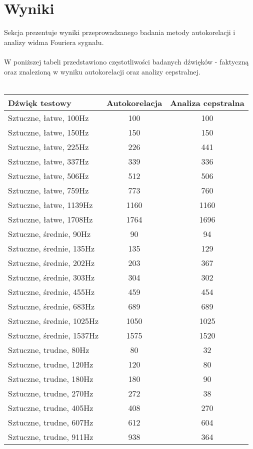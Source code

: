 \documentclass{classrep}
\begin{document}
\section{Wyniki}
Sekcja prezentuje wyniki przeprowadzanego badania metody autokorelacji i analizy widma Fouriera sygnału.\\ 
\\
W poniższej tabeli przedstawiono częstotliwości badanych dźwięków - faktyczną oraz znalezioną w wyniku autokorelacji oraz analizy cepstralnej.\\
\\
\begin{tabular}{ l | c | c }
  \hline
  Dźwięk testowy & Autokorelacja & Analiza cepstralna \\
  \hline			
  Sztuczne, łatwe, 100Hz & 100 & 100 \\
  Sztuczne, łatwe, 150Hz & 150 & 150 \\
  Sztuczne, łatwe, 225Hz & 226 & 441 \\
  Sztuczne, łatwe, 337Hz & 339 & 336 \\
  Sztuczne, łatwe, 506Hz & 512 & 506 \\
  Sztuczne, łatwe, 759Hz & 773 & 760 \\
  Sztuczne, łatwe, 1139Hz & 1160 & 1160 \\
  Sztuczne, łatwe, 1708Hz & 1764 & 1696 \\
  \hline
  Sztuczne, średnie, 90Hz & 90 & 94 \\
  Sztuczne, średnie, 135Hz & 135 & 129 \\
  Sztuczne, średnie, 202Hz & 203 & 367 \\
  Sztuczne, średnie, 303Hz & 304 & 302 \\
  Sztuczne, średnie, 455Hz & 459 & 454 \\
  Sztuczne, średnie, 683Hz & 689 & 689 \\
  Sztuczne, średnie, 1025Hz & 1050 & 1025 \\
  Sztuczne, średnie, 1537Hz & 1575 & 1520 \\
  \hline 
  Sztuczne, trudne, 80Hz & 80 & 32 \\
  Sztuczne, trudne, 120Hz & 120 & 80 \\
  Sztuczne, trudne, 180Hz & 180 & 90 \\
  Sztuczne, trudne, 270Hz & 272 & 38 \\
  Sztuczne, trudne, 405Hz & 408 & 270 \\
  Sztuczne, trudne, 607Hz & 612 & 604 \\
  Sztuczne, trudne, 911Hz & 938 & 364 \\

\end{tabular}
\end{document}
